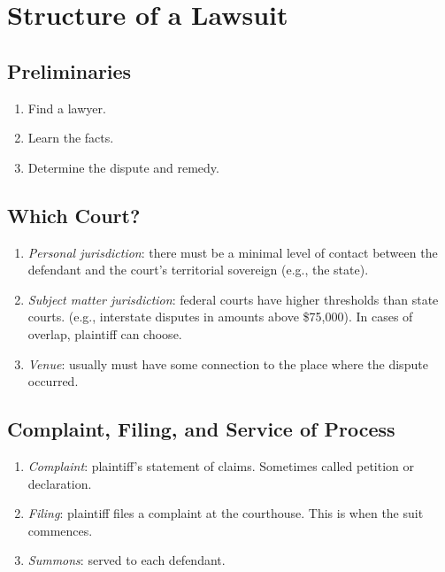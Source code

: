 \section{Structure of a Lawsuit}

\subsection{Preliminaries}

\begin{enumerate}
    \item Find a lawyer.
    \item Learn the facts.
    \item Determine the dispute and remedy.
\end{enumerate}

\subsection{Which Court?}

\begin{enumerate}
    \item \emph{Personal jurisdiction}: there must be a minimal level of 
    contact between the defendant and the court's territorial sovereign (e.g., 
    the state).
    \item \emph{Subject matter jurisdiction}: federal courts have higher 
    thresholds than state courts. (e.g., interstate disputes in amounts above 
    \$75,000). In cases of overlap, plaintiff can choose.
    \item \emph{Venue}: usually must have some connection to the place where 
    the dispute occurred.
\end{enumerate}

\subsection{Complaint, Filing, and Service of Process}

\begin{enumerate}
    \item \emph{Complaint}: plaintiff's statement of claims. Sometimes called 
    petition or declaration.
    \item \emph{Filing}: plaintiff files a complaint at the courthouse. This 
    is when the suit commences.
    \item \emph{Summons}: served to each defendant.
\end{enumerate}

